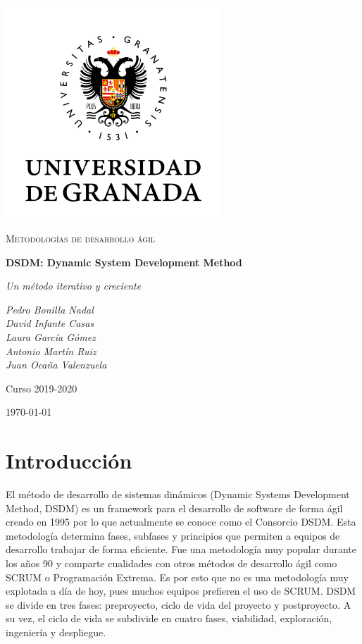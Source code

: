 \documentclass[12pt,a4paper]{article}
\begin{document}
\pgfplotsset{compat=1.16}
\begin{titlepage}
  \centering
  \includegraphics[width=0.6\textwidth]{ugr.png}\par\vspace{1cm}
  {\scshape\large Metodologías de desarrollo ágil \par} \vspace{1cm}
  {\huge\bfseries DSDM: Dynamic System Development Method \par}
  \vspace{0.4cm}
  {\large\itshape Un método iterativo y creciente\\}
  \vspace{0.6cm}
  {\large\itshape  Pedro Bonilla Nadal \\ David Infante Casas \\ Laura García Gómez \\ Antonio Martín Ruiz \\ Juan Ocaña Valenzuela  \par} \vspace{1.00cm}
  Curso 2019-2020 \\
  \vfill

  {\large \today\par}
\end{titlepage}

\tableofcontents
\newpage

\setlength{\parskip}{10pt}
\justify

\section{Introducción}
El método de desarrollo de sistemas dinámicos (Dynamic Systems Development Method, DSDM) es un framework para el desarrollo de software de forma ágil creado en 1995 por lo que actualmente se conoce como el Consorcio DSDM. Esta metodología determina fases, subfases y principios que permiten a equipos de desarrollo trabajar de forma eficiente. Fue una metodología muy popular durante los años 90 y comparte cualidades con otros métodos de desarrollo ágil como SCRUM o Programación Extrema. Es por esto que no es una metodología muy explotada a día de hoy, pues muchos equipos prefieren el uso de SCRUM. DSDM se divide en tres fases: preproyecto, ciclo de vida del proyecto y postproyecto. A su vez, el ciclo de vida se subdivide en cuatro fases, viabilidad, exploración, ingeniería y despliegue.
\end{document}
